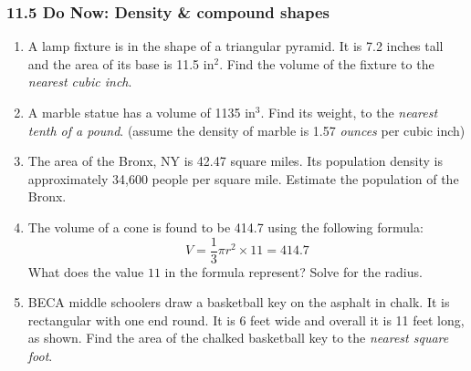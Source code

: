 \documentclass[12pt, twoside]{article}
\begin{document}
\subsubsection*{11.5 Do Now: Density \& compound shapes}
 \begin{enumerate}
  \item A lamp fixture is in the shape of a triangular pyramid. It is 7.2 inches tall and the area of its base is 11.5 in$^2$. Find the volume of the fixture to the \emph{nearest cubic inch}. \vspace{3cm}

  \item A marble statue has a volume of 1135 in$^3$. Find its weight, to the \emph{nearest tenth of a pound}. (assume the density of marble is 1.57 \emph{ounces} per cubic inch) \vspace{3cm}

  \item The area of the Bronx, NY is 42.47 square miles. Its population density is approximately 34,600 people per square mile. Estimate the population of the Bronx. \vspace{3cm}

  \item The volume of a cone is found to be 414.7 using the following formula:
    \[V=\frac{1}{3} \pi r^2 \times 11=414.7\]
    What does the value $11$ in the formula represent? Solve for the radius. \vspace{7cm}

\newpage
  \item BECA middle schoolers draw a basketball key on the asphalt in chalk. It is rectangular with one end round. It is 6 feet wide and overall it is 11 feet long, as shown. Find the area of the chalked basketball key to the \emph{nearest square foot}.\\[1.5cm]


\end{enumerate}
\end{document}
